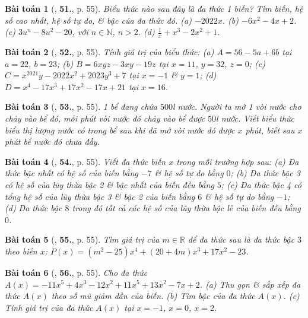 \documentclass{article}
\numberwithin{equation}{section}
\newtheorem{baitoan}{Bài toán}
\begin{document}
\begin{baitoan}[\cite{SBT_Toan_7_Canh_Dieu_tap_2}, \textbf{51.}, p. 55]
	Biểu thức nào sau đây là đa thức 1 biến? Tìm biến, hệ số cao nhất, hệ số tự do, \& bậc của đa thức đó. (a) $-2022x$. (b) $-6x^2 - 4x + 2$. (c) $3u^n - 8u^2 - 20$, với $n\in\mathbb{N}$, $n > 2$. (d) $\frac{1}{x} + x^3 - 2x^2 + 1$.
\end{baitoan}

\begin{baitoan}[\cite{SBT_Toan_7_Canh_Dieu_tap_2}, \textbf{52.}, p. 55]
	Tính giá trị của biểu thức: (a) $A = 56 - 5a + 6b$ tại $a = 22$, $b = 23$; (b) $B = 6xyz - 3xy - 19z$ tại $x = 11$, $y = 32$, $z = 0$; (c) $C = x^{2021}y - 2022x^2 + 2023y^3 + 7$ tại $x = -1$ \& $y = 1$; (d) $D = x^4 - 17x^3 + 17x^2 - 17x + 21$ tại $x = 16$.
\end{baitoan}

\begin{baitoan}[\cite{SBT_Toan_7_Canh_Dieu_tap_2}, \textbf{53.}, p. 55]
	1 bể đang chứa $500$\emph{l} nước. Người ta mở 1 vòi nước cho chảy vào bể đó, mỗi phút vòi nước đó chảy vào bể được $50$\emph{l} nước. Viết biểu thức biểu thị lượng nước có trong bể sau khi đã mở vòi nước đó được $x$ phút, biết sau $x$ phút bể nước đó chưa đầy.
\end{baitoan}

\begin{baitoan}[\cite{SBT_Toan_7_Canh_Dieu_tap_2}, \textbf{54.}, p. 55]
	Viết đa thức biến $x$ trong mỗi trường hợp sau: (a) Đa thức bậc nhất có hệ số của biến bằng $-7$ \& hệ số tự do bằng $0$; (b) Đa thức bậc 3 có hệ số của lũy thừa bậc 2 \& bậc nhất của biến đều bằng $5$; (c) Đa thức bậc 4 có tổng hệ số của lũy thừa bậc 3 \& bậc 2 của biến bằng $6$ \& hệ số tự do bằng $-1$; (d) Đa thức bậc $8$ trong đó tất cả các hệ số của lũy thừa bậc lẻ của biến đều bằng $0$.
\end{baitoan}

\begin{baitoan}[\cite{SBT_Toan_7_Canh_Dieu_tap_2}, \textbf{55.}, p. 55]
	Tìm giá trị của $m\in\mathbb{R}$ để đa thức sau là đa thức bậc $3$ theo biến $x$: $P(x) = (m^2 - 25)x^4 + (20 + 4m)x^3 + 17x^2 - 23$.
\end{baitoan}

\begin{baitoan}[\cite{SBT_Toan_7_Canh_Dieu_tap_2}, \textbf{56.}, p. 55]
	Cho đa thức $A(x) = -11x^5 + 4x^3 - 12x^2 + 11x^5 + 13x^2 - 7x + 2$. (a) Thu gọn \& sắp xếp đa thức $A(x)$ theo số mũ giảm dần của biến. (b) Tìm bậc của đa thức $A(x)$. (c) Tính giá trị của đa thức $A(x)$ tại $x = -1$, $x = 0$, $x = 2$.
\end{baitoan}
\end{document}
